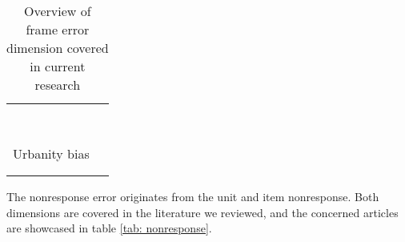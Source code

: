 \begin{table}
\begin{tabular}{ll}
        & \cite{revilla_online_2016, gummer_does_2019}\\
        & \cite{liebe_does_2015}\\
    	& \cite{bosch_measurement_2019}\\
        & \cite{de_bruijne_mobile_2014, zou_mobile_2021}\\
        & \cite{brosnan_pc_2017, antoun_simultaneous_2019}\\
        & \cite{skeie_smartphone_2019, bosch_using_2021}\\
        & \cite{keusch_web_2017, toepoel_what_2014}\\
        & \cite{wenz_willingness_2019}\\
        Urbanity bias & \cite{de_bruijne_mobile_2014}\\
    	& \cite{toepoel_what_2014}\\
        & \cite{keusch_coverage_2020}\\
        \bottomrule
    \end{tabular}
	\caption{Overview of frame error dimension covered in current research}
	\label{tab: frame}
\end{table}


The nonresponse error originates from the unit and item nonresponse. Both dimensions are covered in the literature we reviewed, and the concerned articles are showcased in table \ref{tab: nonresponse}.

